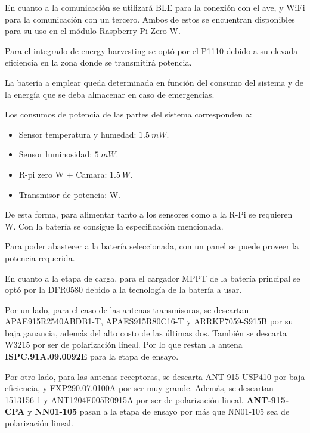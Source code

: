 
En cuanto a la comunicación se utilizará BLE para la conexión con el ave, y WiFi para la comunicación con un tercero.
Ambos de estos se encuentran disponibles para su uso en el módulo Raspberry Pi Zero W.


Para el integrado de energy harvesting se optó por el P1110 debido a su elevada eficiencia en la zona donde se transmitirá potencia.


La batería a emplear queda determinada en función del consumo del sistema y de la energía que se deba almacenar en caso de emergencias. 

Los consumos de potencia de las partes del sistema corresponden a:
\begin{itemize}
	\item Sensor temperatura y humedad: $1.5 \ mW$.
	\item Sensor luminosidad: $5 \ mW$.
	\item R-pi zero W + Camara: $1.5 \ W$.
	\item Transmisor de potencia: \TBD W.
\end{itemize}

De esta forma, para alimentar tanto a los sensores como a la R-Pi se requieren \TBD W. Con la batería \TBD se consigue la especificación mencionada.


Para poder abastecer a la batería seleccionada, con un panel \TBD se puede proveer la potencia requerida.

En cuanto a la etapa de carga, para el cargador MPPT de la batería principal se optó por la DFR0580  debido a la tecnología de la batería a usar.

Por un lado, para el caso de las antenas transmisoras, se descartan APAE915R2540ABDB1-T, APAES915R80C16-T y ARRKP7059-S915B por su baja ganancia, además del alto costo de las últimas dos. También se descarta W3215 por ser de polarización lineal. Por lo que restan la antena \textbf{ISPC.91A.09.0092E} para la etapa de ensayo.

Por otro lado, para las antenas receptoras, se descarta ANT-915-USP410 por baja eficiencia, y FXP290.07.0100A por ser muy grande. Además, se descartan 1513156-1 y ANT1204F005R0915A por ser de polarización lineal. \textbf{ANT-915-CPA} y \textbf{NN01-105} pasan a la etapa de ensayo por más que NN01-105 sea de polarización lineal.

